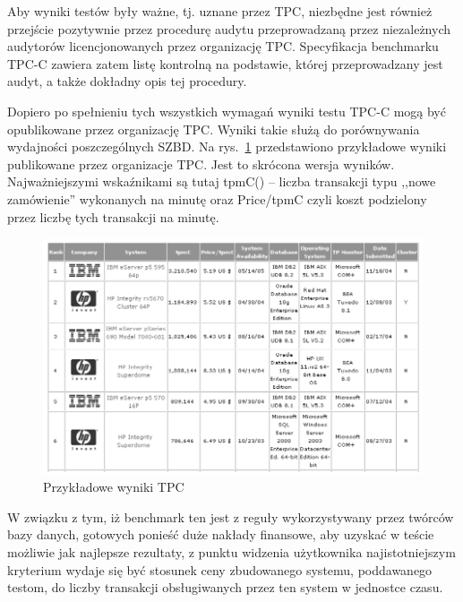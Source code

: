 Aby wyniki testów były ważne, tj. uznane przez TPC, niezbędne jest również przejście pozytywnie
przez procedurę audytu przeprowadzaną przez niezależnych audytorów licencjonowanych
przez organizację TPC. Specyfikacja benchmarku TPC-C zawiera zatem listę kontrolną
na podstawie, której przeprowadzany jest audyt, a także dokładny opis tej procedury.

Dopiero po spełnieniu tych wszystkich wymagań wyniki testu TPC-C mogą być opublikowane przez organizację TPC.
Wyniki takie służą do porównywania wydajności poszczególnych SZBD. Na rys.~\ref{rys:tpc_sample_results} 
przedstawiono przykładowe wyniki publikowane przez organizacje TPC. Jest to skrócona wersja wyników. 
Najważniejszymi wskaźnikami są tutaj tpmC() 
-- liczba transakcji typu ,,nowe zamówienie'' wykonanych na minutę oraz Price/tpmC czyli 
koszt podzielony przez liczbę tych transakcji na minutę.

\begin{figure}[h]
\begin{center}
\includegraphics[width=0.8\linewidth]{figures/tpc/tpc_sample_results.png}
\end{center}
\caption{Przykładowe wyniki TPC\cite{TPC1}}\label{rys:tpc_sample_results}
\end{figure}

W związku z tym, iż benchmark ten jest z reguły wykorzystywany przez twórców bazy danych,
gotowych ponieść duże nakłady finansowe, aby uzyskać w teście możliwie jak najlepsze rezultaty,
z punktu widzenia użytkownika najistotniejszym kryterium wydaje się być stosunek ceny zbudowanego systemu,
poddawanego testom, do liczby transakcji obsługiwanych przez ten system w jednostce czasu. 

